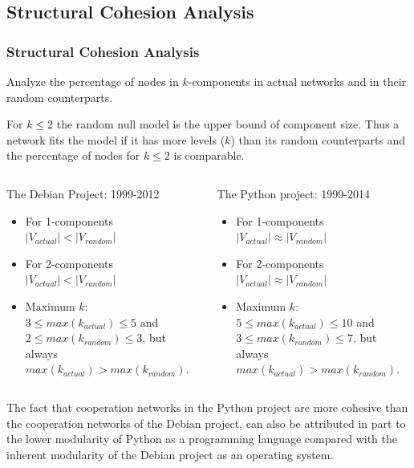 \documentclass[ignorenonframetext,red,8pt,notes=show]{beamer}
\begin{document}
\subsection{Structural Cohesion Analysis}

\begin{frame}
\frametitle{Structural Cohesion Analysis}

Analyze the percentage of nodes in $k$-components in actual networks and in their random counterparts.

For $k \leq 2$ the random null model is the upper bound of component size. Thus a network fits the model if it has more levels ($k$) than its random counterparts and the percentage of nodes for $k \leq 2$ is comparable. 

\begin{columns}[c]
\begin{column}{0.5\textwidth}
\begin{block}{The Debian Project: 1999-2012}
\begin{itemize}
\item For 1-components $|V_{actual}| < |V_{random}|$
\item For 2-components $|V_{actual}| < |V_{random}|$
\item Maximum $k$:\\ $3 \leq max(k_{actual}) \leq 5$ and\\ $2 \leq  max(k_{random}) \leq 3$, but always \\ $max(k_{actual}) > max(k_{random})$. 
\end{itemize}
\end{block}
\end{column}

\begin{column}{0.5\textwidth}
\begin{block}{The Python project: 1999-2014}
\begin{itemize}
\item For 1-components $|V_{actual}| \approx |V_{random}|$
\item For 2-components $|V_{actual}| \approx |V_{random}|$
\item Maximum $k$:\\ $5 \leq max(k_{actual}) \leq 10$ and\\ $3 \leq  max(k_{random}) \leq 7$, but always\\ $max(k_{actual}) > max(k_{random})$. 
\end{itemize}
\end{block}
\end{column}
\end{columns}

\vspace{0.3cm}

The fact that cooperation networks in the Python project are more cohesive than the cooperation networks of the Debian project, can also be attributed in part to the lower modularity of Python as a programming language compared with the inherent modularity of the Debian project as an operating system.

\end{frame}
\end{document}
